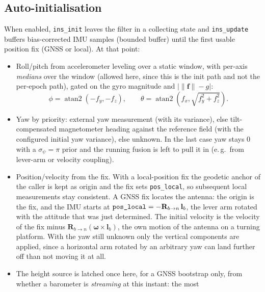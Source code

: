 \documentclass[11pt,a4paper]{article}
\newcommand{\vect}[1]{\bm{#1}}
\newcommand{\code}[1]{\texttt{#1}}
\begin{document}
\subsection{Auto-initialisation}
\label{sec:auto-init}

When enabled, \code{ins\_\allowbreak{}init} leaves the filter in a collecting
state and \code{ins\_\allowbreak{}update} buffers bias-corrected IMU samples (bounded
buffer) until the first usable position fix (GNSS or local). At that
point:
\begin{itemize}
  \item Roll/pitch from accelerometer leveling over a static
        window, with per-axis \emph{medians} over the window (allowed here,
        since this is the init path and not the per-epoch path), gated on the gyro magnitude and
        $\big|\|\vect{f}\| - g\big|$:
        \begin{equation}
          \phi = \operatorname{atan2}(-f_y, -f_z), \qquad
          \theta = \operatorname{atan2}\!\left(f_x,
            \sqrt{f_y^2 + f_z^2}\right).
        \end{equation}
  \item Yaw by priority: external yaw measurement (with its
        variance), else tilt-compensated magnetometer heading against
        the reference field (with the configured initial yaw variance),
        else unknown. In the last case yaw stays $0$ with a $\sigma_\psi = \pi$
        prior and the running fusion is left to pull it in (e.\,g.\ from
        lever-arm or velocity coupling).
  \item Position/velocity from the fix. With a local-position
        fix the geodetic anchor of the caller is kept as origin and the fix sets
        \code{pos\_\allowbreak{}local}, so subsequent local measurements stay
        consistent. A GNSS fix locates the antenna: the origin is the fix,
        and the IMU starts at
        $\code{pos\_\allowbreak{}local} = -\mathbf{R}_{b\to n}\,\mathbf{l}_b$, the
        lever arm rotated with the attitude that was just determined. The initial
        velocity is the velocity of the fix minus
        $\mathbf{R}_{b\to n}(\boldsymbol{\omega}\times\mathbf{l}_b)$, the
        own motion of the antenna on a turning platform. With the yaw still
        unknown only the vertical components are applied, since a
        horizontal arm rotated by an arbitrary yaw can land further off
        than not moving it at all.
  \item The height source is latched once here, for a GNSS bootstrap only,
        from whether a barometer is \emph{streaming} at this instant: the most

\end{itemize}
\end{document}
